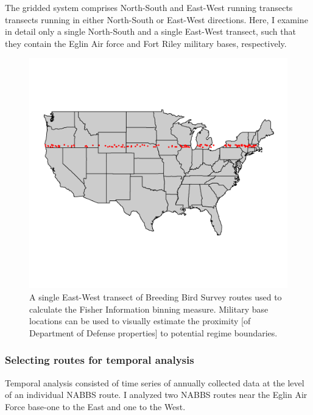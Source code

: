 \documentclass[12pt,twoside,openany]{reedthesis}
\begin{document}
The gridded system comprises North-South and East-West running transects
transects running in either North-South or East-West directions. Here, I
examine in detail only a single North-South and a single East-West
transect, such that they contain the Eglin Air force and Fort Riley
military bases, respectively.
\begin{figure}

{\centering \includegraphics[width=30.03in]{./chapterFiles/fisherSpatial/figures/figsCalledInDiss/transectSamplingEx_row18} 

}

\caption{A single East-West transect of Breeding Bird Survey routes used to calculate the Fisher Information binning measure. Military base locations can be used to visually estimate the proximity [of Department of Defense properties] to potential regime boundaries.}\label{fig:ewRouteMap}
\end{figure}
\subsubsection{Selecting routes for temporal
analysis}\label{selecting-routes-for-temporal-analysis}

Temporal analysis consisted of time series of annually collected data at
the level of an individual NABBS route. I analyzed two NABBS routes near
the Eglin Air Force base-one to the East and one to the West.
\end{document}
